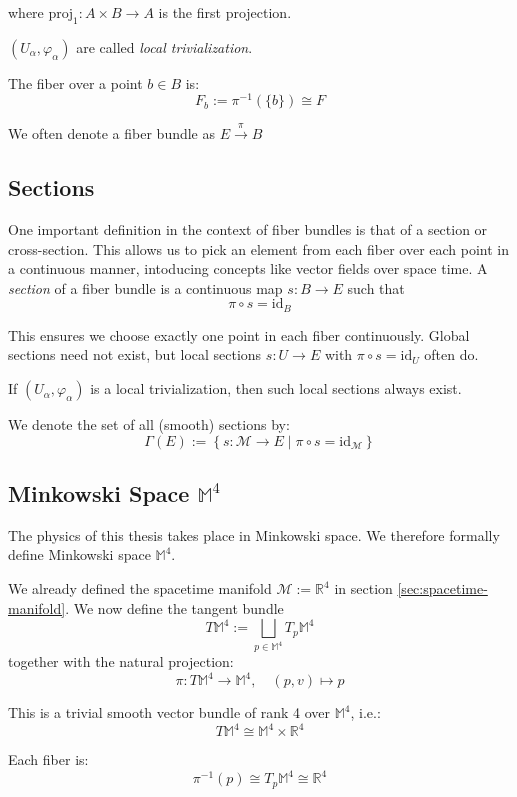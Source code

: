 where $\text{proj}_1: A \times B \to A$ is the first projection.

$(U_\alpha, \varphi_\alpha)$ are called \emph{local trivialization}.

The fiber over a point $b \in B$ is:
\[
F_b := \pi^{-1}(\{b\}) \cong F
\]

We often denote a fiber bundle as $E \xrightarrow{\pi} B$

\subsection*{Sections}

One important definition in the context of fiber bundles is that of a section or cross-section. This allows us to pick an element from each fiber over each point in a continuous manner, intoducing concepts like vector fields over space time.
A \emph{section} of a fiber bundle is a continuous map $s: B \to E$ such that
\[
\pi \circ s = \mathrm{id}_B
\]

This ensures we choose exactly one point in each fiber continuously. Global sections need not exist, but local sections $s: U \to E$ with $\pi \circ s = \mathrm{id}_U$ often do.

If $(U_\alpha, \varphi_\alpha)$ is a local trivialization, then such local sections always exist.

We denote the set of all (smooth) sections by:
\[
\Gamma(E) := \left\{ s: \mathcal{M} \to E \mid \pi \circ s = \mathrm{id}_{\mathcal{M}} \right\}
\]
\subsection{Minkowski Space \texorpdfstring{$\mathbb{M}^4$}{M⁴}}

The physics of this thesis takes place in Minkowski space. We therefore formally define Minkowski space $\mathbb{M}^4$.

We already defined the spacetime manifold $\mathcal{M} := \mathbb{R}^4$ in section \ref{sec:spacetime-manifold}. We now define the tangent bundle
\[
T\mathbb{M}^4 := \bigsqcup_{p \in \mathbb{M}^4} T_p \mathbb{M}^4
\]
together with the natural projection:
\[
\pi: T\mathbb{M}^4 \to \mathbb{M}^4, \quad (p, v) \mapsto p
\]

This is a trivial smooth vector bundle of rank 4 over $\mathbb{M}^4$, i.e.:
\[
T\mathbb{M}^4 \cong \mathbb{M}^4 \times \mathbb{R}^4
\]

Each fiber is:
\[
\pi^{-1}(p) \cong T_p \mathbb{M}^4 \cong \mathbb{R}^4
\]

